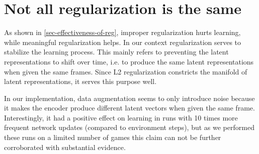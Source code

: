\section{Not all regularization is the same}
As shown in \ref{sec-effectiveness-of-reg}, improper regularization hurts learning, while
meaningful regularization helps.
In our context regularization serves to stabilize the learning process.
This mainly refers to preventing the latent representations to shift over time,
i.e. to produce the same latent representations when given the same frames.
Since L2 regularization constricts the manifold of latent representations,
it serves this purpose well.

In our implementation, data augmentation seems to only introduce noise because it makes
the encoder produce
different latent vectors when given the same frame.
Interestingly, it had a positive effect on learning in runs with 10 times more frequent
network updates (compared to environment steps), but as we performed these runs
on a limited number of games this claim can not be further corroborated with substantial evidence.

